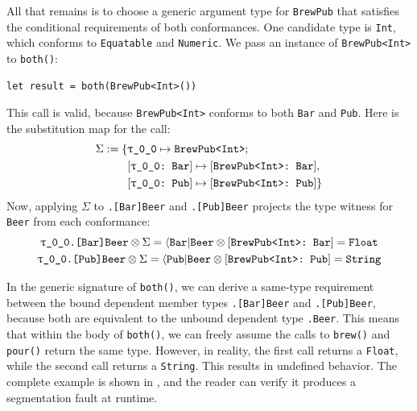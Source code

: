 \documentclass[../generics]{subfiles}
\begin{document}
\begin{example}
All that remains is to choose a generic argument type for \texttt{BrewPub} that satisfies the conditional requirements of both conformances. One candidate type is \texttt{Int}, which conforms to \texttt{Equatable} and \texttt{Numeric}. We pass an instance of \texttt{BrewPub<Int>} to \texttt{both()}:
\begin{Verbatim}
let result = both(BrewPub<Int>())
\end{Verbatim}
This call is valid, because \texttt{BrewPub<Int>} conforms to both \texttt{Bar} and \texttt{Pub}. Here is the substitution map for the call:
\begin{align*}
\Sigma := \SubstMapC{
&\SubstType{\rT}{BrewPub<Int>}}{\\
&\SubstConf{\rT}{BrewPub<Int>}{Bar},\\
&\SubstConf{\rT}{BrewPub<Int>}{Pub}
}
\end{align*}
Now, applying $\Sigma$ to \texttt{\rT.[Bar]Beer} and \texttt{\rT.[Pub]Beer} projects the type witness for \texttt{Beer} from each conformance:
\begin{gather*}
\texttt{\rT.[Bar]Beer}\otimes\Sigma = \AssocType{Bar}{Beer}\otimes\ConfReq{BrewPub<Int>}{Bar} = \texttt{Float}\\
\texttt{\rT.[Pub]Beer}\otimes\Sigma = \AssocType{Pub}{Beer}\otimes\ConfReq{BrewPub<Int>}{Pub} = \texttt{String}
\end{gather*}

In the generic signature of \texttt{both()}, we can derive a same-type requirement between the bound dependent member types \texttt{\rT.[Bar]Beer} and \texttt{\rT.[Pub]Beer}, because both are equivalent to the unbound dependent type \texttt{\rT.Beer}. This means that within the body of \texttt{both()}, we can freely assume the calls to \texttt{brew()} and \texttt{pour()} return the same type. However, in reality, the first call returns a \texttt{Float}, while the second call returns a \texttt{String}. This results in undefined behavior. The complete example is shown in , and the reader can verify it produces a segmentation fault at runtime.
\end{example}

\begin{listing}\label{listing:unsound conditional conformance}
\end{listing}
\end{document}
